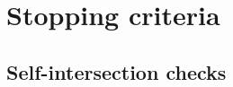 \section{Stopping criteria}
\label{sec:stopping_criteria}



\subsection{Self-intersection checks}
\label{sub:self_intersection_checks}




